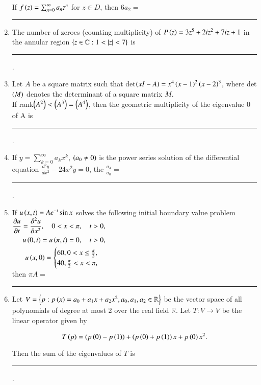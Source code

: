 \documentclass[journal,12pt,onecolumn]{IEEEtran}
\theoremstyle{remark}
\begin{document}
\begin{enumerate}
If $f\left(z\right) = \sum^\infty_{n=0}a_nz^n$ for $z \in D$, then $6a_2=$\rule{2cm}{0.15mm}
\item The number of zeroes (counting multiplicity) of $P\left(z\right) = 3z^5+2iz^2+7iz+1$ in the annular region $\left\{z\in \mathbb{C}:1<\left\vert z\right\vert<7\right\}$ is \rule{2cm}{0.15mm}.
\item Let $A$ be a square matrix such that det$\left(xI-A\right)=x^4\left(x-1\right)^2\left(x-2\right)^3$, where det$\left(M\right)$ denotes the determinant of a square matrix $M$.\\
If rank$\left(A^2\right)<\left(A^3\right)=\left(A^4\right)$, then the geometric multiplicity of the eigenvalue 0 of A is \rule{2cm}{0.15mm}.
\item If $y = \sum^\infty_{k=0}a_kx^k$, $\left(a_0\neq0\right)$ is the power series solution of the differential equation $\frac{d^2y}{dx^2}-24x^2y=0$, the $\frac{a_4}{a_0}=$ \rule{2cm}{0.15mm}.
\item If $u\left(x,t\right)=Ae^{-t}\sin x$ solves the following initial boundary value problem\\
$\begin{aligned}
    \frac{\partial u}{\partial t} = \frac{\partial^2 u}{\partial x^2}, \quad 0 < x < \pi, \quad t > 0, \\
    u\left(0,t\right) = u\left(\pi,t\right) = 0, \quad t > 0, \\
    u\left(x,0\right) = \begin{cases}
        60,  0 < x \leq \frac{\pi}{2}, \\
        40,  \frac{\pi}{2} < x < \pi,
    \end{cases}
\end{aligned}$\\
then $\pi A=$\rule{2cm}{0.15mm}
\item Let $V = \left\{p: p\left(x\right) = a_0 + a_1x + a_2x^2, a_0, a_1, a_2 \in \mathbb{R}\right\}$ be the vector space of all polynomials of degree at most 2 over the real field $\mathbb{R}$. Let $T: V \rightarrow V$ be the linear operator given by

\[T\left(p\right) = \left(p\left(0\right) - p\left(1\right)\right) + \left(p\left(0\right) + p\left(1\right)\right)x + p\left(0\right)x^2.\]

Then the sum of the eigenvalues of $T$ is \rule{2cm}{0.15mm}.
\end{enumerate}
\end{document}
